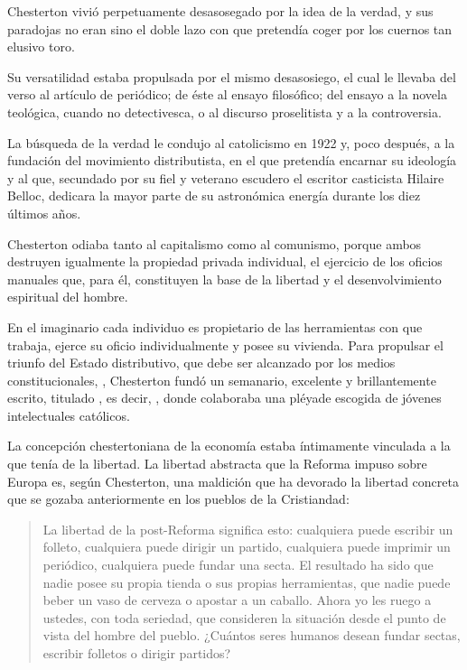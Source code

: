 Chesterton vivió perpetuamente desasosegado por la idea de la verdad, y sus paradojas no eran sino
el doble lazo con que pretendía coger por los cuernos tan elusivo toro.

Su versatilidad estaba propulsada por el mismo desasosiego, el cual le llevaba del verso al artículo
de periódico; de éste al ensayo filosófico; del ensayo a la novela teológica, cuando no detectivesca, o al
discurso proselitista y a la controversia.

La búsqueda de la verdad le condujo al catolicismo en 1922 y, poco después, a la fundación del
movimiento distributista, en el que pretendía encarnar su ideología y al que, secundado por su fiel y
veterano escudero el escritor casticista Hilaire Belloc, dedicara la mayor parte de su astronómica energía
durante los diez últimos años.

Chesterton odiaba tanto al capitalismo como al comunismo, porque ambos destruyen igualmente la
propiedad privada individual, el ejercicio de los oficios manuales que, para él, constituyen la base de la
libertad y el desenvolvimiento espiritual del hombre.

En el imaginario  cada individuo es propietario de las herramientas con que
trabaja, ejerce su oficio individualmente y posee su vivienda. Para propulsar el triunfo del Estado
distributivo, que debe ser alcanzado por los medios constitucionales, , Chesterton fundó un semanario, excelente y brillantemente escrito, titulado ,
es decir, , donde colaboraba una pléyade escogida de jóvenes intelectuales
católicos.

La concepción chestertoniana de la economía estaba íntimamente vinculada a la que tenía de la
libertad.
La libertad abstracta que la Reforma impuso sobre Europa es, según Chesterton, una maldición que
ha devorado la libertad concreta que se gozaba anteriormente en los pueblos de la Cristiandad:

\begin{quote}
La
libertad de la post-Reforma significa esto: cualquiera puede escribir un folleto, cualquiera puede dirigir un
partido, cualquiera puede imprimir un periódico, cualquiera puede fundar una secta. El resultado ha sido
que nadie posee su propia tienda o sus propias herramientas, que nadie puede beber un vaso de cerveza o
apostar a un caballo. Ahora yo les ruego a ustedes, con toda seriedad, que consideren la situación desde el
punto de vista del hombre del pueblo. ¿Cuántos seres humanos desean fundar sectas, escribir folletos o
dirigir partidos?
\end{quote}

